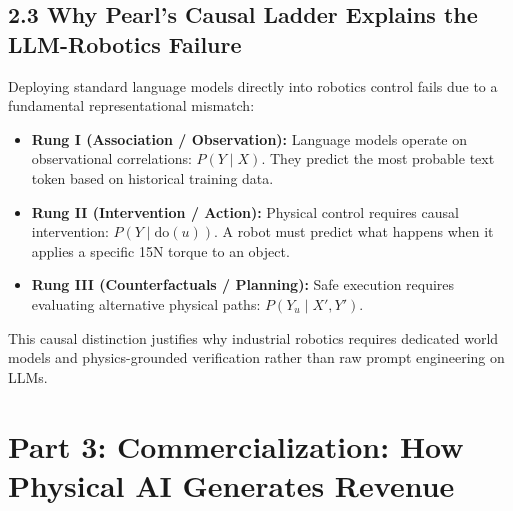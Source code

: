 \documentclass[11pt,a4paper]{article}
\begin{document}
\subsection{2.3 Why Pearl's Causal Ladder Explains the LLM-Robotics Failure}
Deploying standard language models directly into robotics control fails due to a fundamental representational mismatch:
\begin{itemize}
    \item \textbf{Rung I (Association / Observation):} Language models operate on observational correlations: $P(Y \mid X)$. They predict the most probable text token based on historical training data.
    \item \textbf{Rung II (Intervention / Action):} Physical control requires causal intervention: $P(Y \mid \text{do}(u))$. A robot must predict what happens when it applies a specific 15N torque to an object.
    \item \textbf{Rung III (Counterfactuals / Planning):} Safe execution requires evaluating alternative physical paths: $P(Y_u \mid X', Y')$.
\end{itemize}
This causal distinction justifies why industrial robotics requires dedicated world models and physics-grounded verification rather than raw prompt engineering on LLMs.

\section{Part 3: Commercialization: How Physical AI Generates Revenue}
\end{document}
